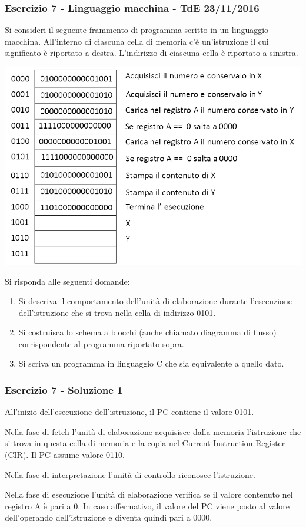 \documentclass[]{beamer}
\begin{document}
\begin{frame}[allowframebreaks]
\frametitle{Esercizio 7 - Linguaggio macchina - TdE 23/11/2016}
Si consideri il seguente frammento di programma scritto in un linguaggio macchina.
All'interno di ciascuna cella di memoria c'è un'istruzione il cui significato è riportato a destra.
L'indirizzo di ciascuna cella è riportato a sinistra. 

\includegraphics[width=0.6\linewidth]{./codice_macchina}
\pause

Si risponda alle seguenti domande:
\begin{enumerate}
\item Si descriva il comportamento dell'unità di elaborazione durante l'esecuzione dell'istruzione che si trova nella cella di indirizzo 0101.
\item Si costruisca lo schema a blocchi (anche chiamato diagramma di flusso) corrispondente al programma riportato sopra.
\item Si scriva un programma in linguaggio C che sia equivalente a quello dato.
\end{enumerate}
\end{frame}

\begin{frame}
\frametitle{Esercizio 7 - Soluzione 1}
All'inizio dell'esecuzione dell'istruzione, il PC contiene il valore 0101.

Nella fase di fetch l'unità di elaborazione acquisisce dalla memoria l'istruzione che si trova in questa cella di memoria e la copia nel Current Instruction Register (CIR). Il PC assume valore 0110.

Nella fase di interpretazione l'unità di controllo riconosce l'istruzione.

Nella fase di esecuzione l'unità di elaborazione verifica se il valore contenuto nel registro A è pari a 0. In caso affermativo, il valore del PC viene posto al valore dell'operando dell'istruzione e diventa quindi pari a 0000. 
\end{frame}
\end{document}

